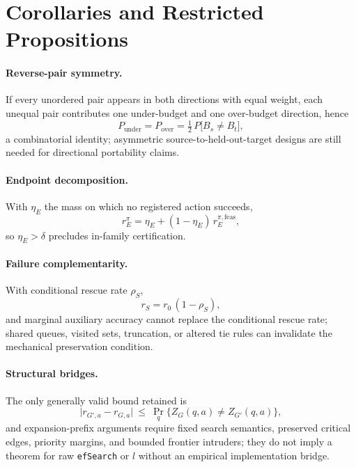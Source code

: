 \documentclass{article}
\renewcommand{\Pr}{\mathop{\mathrm{Pr}}}   %
\begin{document}
\section{Corollaries and Restricted Propositions}
\label{app:corollaries}

\paragraph{Reverse-pair symmetry.} If every unordered pair appears in both directions with equal weight,
each unequal pair contributes one under-budget and one over-budget direction, hence
\begin{equation}
P_{\mathrm{under}}=P_{\mathrm{over}}=\tfrac{1}{2}\,P\bigl[B_{s}\neq B_{t}\bigr],
\label{eq:sym}
\end{equation}
a combinatorial identity; asymmetric source-to-held-out-target designs are still needed for directional
portability claims.

\paragraph{Endpoint decomposition.} With $\eta_E$ the mass on which no registered action succeeds,
\begin{equation}
r_{E}^{\pi}=\eta_{E}+(1-\eta_{E})\,r_{E}^{\pi,\mathrm{feas}},
\label{eq:endpoint}
\end{equation}
so $\eta_E>\delta$ precludes in-family certification.

\paragraph{Failure complementarity.} With conditional rescue rate $\rho_S$,
\begin{equation}
r_{S}=r_{0}\,(1-\rho_{S}),
\label{eq:rescue}
\end{equation}
and marginal auxiliary accuracy cannot replace the conditional rescue rate; shared queues, visited sets,
truncation, or altered tie rules can invalidate the mechanical preservation condition.

\paragraph{Structural bridges.} The only generally valid bound retained is
\begin{equation}
\bigl|r_{G',a}-r_{G,a}\bigr|\ \le\ \Pr_{q}\{Z_{G}(q,a)\neq Z_{G'}(q,a)\},
\label{eq:bridge}
\end{equation}
and expansion-prefix arguments require fixed search semantics, preserved critical edges, priority margins,
and bounded frontier intruders; they do not imply a theorem for raw \texttt{efSearch} or $l$ without an
empirical implementation bridge.
\end{document}
